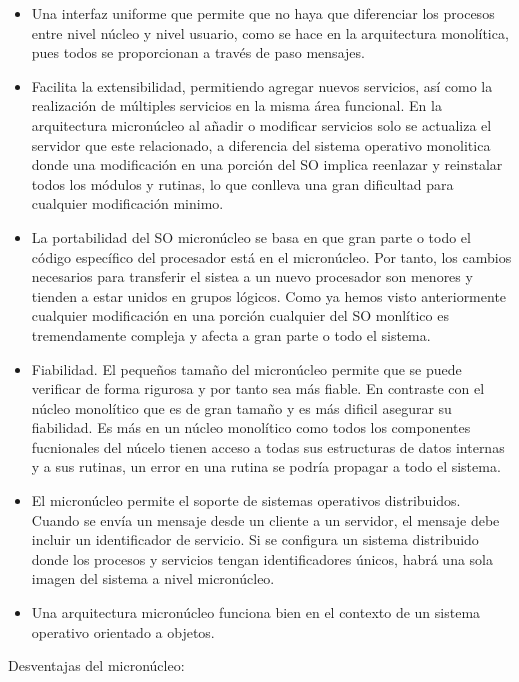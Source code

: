\documentclass{article}
\begin{document}
					\begin{itemize}
					\item Una interfaz uniforme que permite que no haya que diferenciar los procesos entre nivel núcleo y nivel usuario, como se hace en la arquitectura monolítica, pues todos se proporcionan a través de paso  mensajes.
					\item Facilita la extensibilidad, permitiendo agregar nuevos servicios, así como la realización de múltiples servicios en la misma área funcional. En la arquitectura micronúcleo al añadir o modificar servicios solo se actualiza el servidor que este relacionado, a diferencia del sistema operativo monolitica donde una modificación en una porción del SO implica reenlazar y reinstalar todos los módulos y rutinas, lo que conlleva una gran dificultad para cualquier modificación minimo.
					\item La portabilidad del SO micronúcleo se basa en que gran parte o todo el código específico del procesador está en el micronúcleo. Por tanto, los cambios necesarios para transferir el sistea a un nuevo procesador son menores y tienden a estar unidos en grupos lógicos. Como ya hemos visto anteriormente cualquier modificación en una porción cualquier del SO monlítico es tremendamente compleja y afecta a gran parte o todo el sistema.
					
					\item Fiabilidad. El pequeños tamaño del micronúcleo permite que se puede verificar de forma rigurosa y por tanto sea más fiable. En contraste con el núcleo monolítico que es de gran tamaño y es más dificil asegurar su fiabilidad. Es más en un núcleo monolítico como todos los componentes fucnionales del núcelo tienen acceso a todas sus estructuras de datos internas y a sus rutinas, un error en una rutina se podría propagar a todo el sistema.
					
					\item El micronúcleo permite el soporte de sistemas operativos distribuidos. Cuando se envía un mensaje desde un cliente a un servidor, el mensaje debe incluir un identificador de servicio. Si se configura un sistema distribuido donde los procesos y servicios tengan identificadores únicos, habrá una sola imagen del sistema a nivel micronúcleo. 
					\item Una arquitectura micronúcleo funciona bien en el contexto de un sistema operativo orientado a objetos.
					\end{itemize}
					
					Desventajas del micronúcleo:
					
\end{document}

